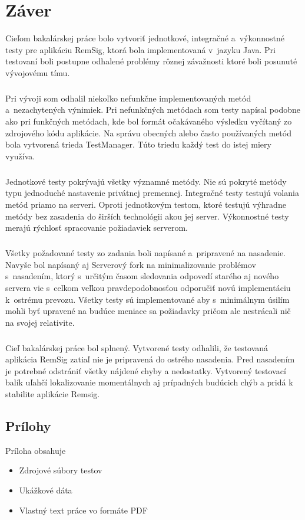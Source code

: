 \documentclass[
  digital, %
  table,   %
oneside,
  nolof,     %
  nolot,     %
]{fithesis3}
\begin{document}
\chapter{Záver}
Cieľom bakalárskej práce bolo vytvoriť jednotkové, integračné a~výkonnostné testy pre aplikáciu RemSig, ktorá bola implementovaná v~jazyku Java. Pri testovaní boli postupne odhalené problémy rôznej závažnosti ktoré boli posunuté vývojovému tímu. \paragraph{}
Pri vývoji som odhalil niekoľko nefunkčne implementovaných metód a~nezachytených výnimiek. Pri nefunkčných metódach som testy napísal podobne ako pri funkčných metódach, kde bol formát očakávaného výsledku vyčítaný zo zdrojového kódu aplikácie. Na správu obecných alebo často používaných metód bola vytvorená trieda TestManager. Túto triedu každý test do istej miery využíva. \paragraph{}
Jednotkové testy pokrývajú všetky významné metódy. Nie sú pokryté metódy typu jednoduché nastavenie privátnej premennej. Integračné testy testujú volania metód priamo na serveri. Oproti jednotkovým testom, ktoré testujú výhradne metódy bez zasadenia do širších technológii akou jej server. Výkonnostné testy merajú rýchlosť spracovanie požiadaviek serverom.\paragraph{}
Všetky požadované testy zo zadania boli napísané a~pripravené na nasadenie. Navyše bol napísaný aj Serverový fork na minimalizovanie problémov s~nasadením, ktorý s~určitým časom sledovania odpovedí starého aj nového servera vie s~celkom veľkou pravdepodobnosťou odporučiť novú implementáciu k~ostrému prevozu. Všetky testy sú  implementované aby s~minimálnym úsilím mohli byť upravené na budúce meniace sa požiadavky pričom ale nestrácali nič na svojej relativite.\paragraph{}
Cieľ bakalárskej práce bol splnený. Vytvorené testy odhalili, že testovaná aplikácia RemSig zatiaľ nie je pripravená do ostrého nasadenia. Pred nasadením je potrebné odstrániť všetky nájdené chyby a nedostatky. Vytvorený testovací balík uľahčí lokalizovanie momentálnych aj prípadných budúcich chýb a pridá k stabilite aplikácie Remsig.

\printbibliography

  

\begin{appendix}


\chapter{Prílohy}
Príloha obsahuje
\begin{itemize}
	\item Zdrojové súbory testov
	\item Ukážkové dáta 
	\item Vlastný text práce vo formáte PDF
\end{itemize}



\end{appendix}
\end{document}
